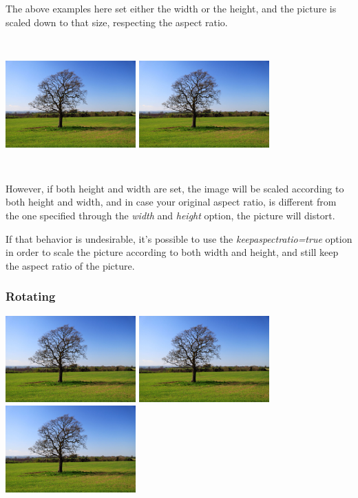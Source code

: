 \documentclass[a4paper]{article}
\begin{document}
The above examples here set either the width or the height, and the picture
is scaled down to that size, respecting the aspect ratio.

\includegraphics[width=5cm,height=5cm]{lonely-tree}
\includegraphics[width=5cm,height=5cm,keepaspectratio=true]{lonely-tree}

However, if both height and width are set, the image will be scaled according
to both height and width, and in case your original aspect ratio, is different
from the one specified through the \textit{width} and \textit{height} option,
the picture will distort.

If that behavior is undesirable, it's possible to use the
\textit{keepaspectratio=true} option in order to scale the picture according to
both width and height, and still keep the aspect ratio of the picture.


\subsubsection{Rotating}
\includegraphics[width=5cm,angle=90]{lonely-tree}
\includegraphics[width=5cm,angle=180]{lonely-tree}
\includegraphics[width=5cm,angle=270]{lonely-tree}
\end{document}
